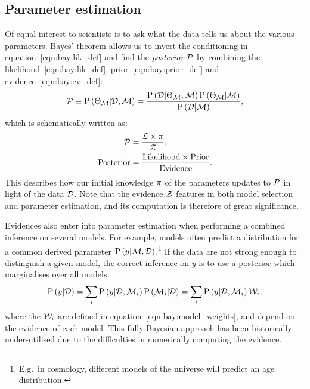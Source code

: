 \subsection{Parameter estimation}
Of equal interest to scientists is to ask what the data tells us about the various parameters.  
Bayes' theorem allows us to invert the conditioning in equation~\eqref{eqn:bay:lik_def} and find the {\em posterior\/} \(\mathcal{P}\) by combining the likelihood~\eqref{eqn:bay:lik_def}, prior~\eqref{eqn:bay:prior_def} and evidence~\eqref{eqn:bay:ev_def}:
\begin{equation}
  \mathcal{P}\equiv
  \mathrm{P}\left(\Theta_{\mathcal{M}}\middle|\mathcal{D},\mathcal{M}\right) = \frac{\mathrm{P}\left(\mathcal{D}\middle|\Theta_{\mathcal{M}},\mathcal{M}\right) \mathrm{P}\left(\Theta_{\mathcal{M}}\middle|\mathcal{M}\right)}{\mathrm{P}\left(\mathcal{D}\middle|\mathcal{M}\right)},
  \label{eqn:bay:bayes_theorem}
\end{equation}
which is schematically written as:
\begin{align}
  \mathcal{P} &= \frac{\mathcal{L} \times \pi }{\mathcal{Z} },
  \label{eqn:bay:bayes_theorem_abbrv}\\
  \mathrm{Posterior} &= \frac{\mathrm{Likelihood} \times \mathrm{Prior} }{\mathrm{Evidence} }.
\end{align}
This describes how our initial knowledge \(\pi\) of the parameters updates to \(\mathcal{P}\) in light of the data \(\mathcal{D}\). Note that the evidence \(\mathcal{Z}\) features in both model selection and parameter estimation, and its computation is therefore of great significance.

Evidences also enter into parameter estimation when performing a combined inference on several models.
For example, models often predict a distribution for a common derived parameter \(\mathrm{P}\left(y\middle|\mathcal{M},\mathcal{D}\right)\).\footnote{E.g.\ in cosmology, different models of the universe will predict an age distribution.} If the data are not strong enough to distinguish a given model, the correct inference on \(y\) is to use a posterior which marginalises over all models:
\begin{equation}
  \mathrm{P}\left(y\middle|\mathcal{D}\right) 
  = \sum_i\mathrm{P}\left(y\middle|\mathcal{D},\mathcal{M}_i\right)\mathrm{P}\left(\mathcal{M}_i\middle|\mathcal{D}\right)
  = \sum_i\mathrm{P}\left(y\middle|\mathcal{D},\mathcal{M}_i\right)\mathcal{W}_i,
\end{equation}
where the \(\mathcal{W}_i\) are defined in equation~\eqref{eqn:bay:model_weights}, and depend on the evidence of each model.
This fully Bayesian approach has been historically under-utilised due to the difficulties in numerically computing the evidence.





